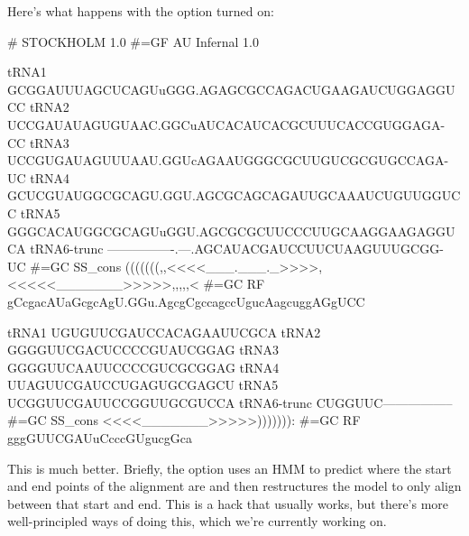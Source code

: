 Here's what happens with the  option turned on:

{\samepage
\begin{sreoutput}
# STOCKHOLM 1.0
#=GF AU Infernal 1.0

tRNA1        GCGGAUUUAGCUCAGUuGGG.AGAGCGCCAGACUGAAGAUCUGGAGGUCC
tRNA2        UCCGAUAUAGUGUAAC.GGCuAUCACAUCACGCUUUCACCGUGGAGA-CC
tRNA3        UCCGUGAUAGUUUAAU.GGUcAGAAUGGGCGCUUGUCGCGUGCCAGA-UC
tRNA4        GCUCGUAUGGCGCAGU.GGU.AGCGCAGCAGAUUGCAAAUCUGUUGGUCC
tRNA5        GGGCACAUGGCGCAGUuGGU.AGCGCGCUUCCCUUGCAAGGAAGAGGUCA
tRNA6-trunc  ----------------.---.AGCAUACGAUCCUUCUAAGUUUGCGG-UC
#=GC SS_cons (((((((,,<<<<___.___._>>>>,<<<<<_______>>>>>,,,,,<
#=GC RF      gCcgacAUaGcgcAgU.GGu.AgcgCgccagccUgucAagcuggAGgUCC

tRNA1        UGUGUUCGAUCCACAGAAUUCGCA
tRNA2        GGGGUUCGACUCCCCGUAUCGGAG
tRNA3        GGGGUUCAAUUCCCCGUCGCGGAG
tRNA4        UUAGUUCGAUCCUGAGUGCGAGCU
tRNA5        UCGGUUCGAUUCCGGUUGCGUCCA
tRNA6-trunc  CUGGUUC-----------------
#=GC SS_cons <<<<_______>>>>>))))))):
#=GC RF      gggGUUCGAUuCcccGUgucgGca

\end{sreoutput}
}

This is much better. Briefly, the  option uses an HMM to
predict where the start and end points of the alignment are and then
restructures the model to only align between that start and end. This
is a hack that usually works, but there's more well-principled ways of
doing this, which we're currently working on.

